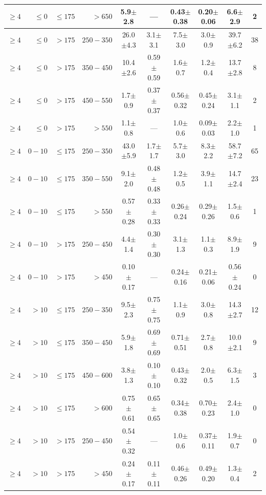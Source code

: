 \begin{table}[htbp]
{\begin{tabular}{|r|r|r|r|c|c|c|c|c|c|}
$\geq4$ & $\leq0$ & $\leq175$ &    $>650$ & 5.9$\pm$2.8 & --- & 0.43$\pm$0.38 & 0.20$\pm$0.06 & 6.6$\pm$2.9 & 2 \\
\hline
$\geq4$ & $\leq0$ &     $>175$ & $250-350$ & 26.0$\pm$4.3 & 3.1$\pm$3.1 & 7.5$\pm$3.0 & 3.0$\pm$0.9 & 39.7$\pm$6.2 & 38 \\
$\geq4$ & $\leq0$ &     $>175$ & $350-450$ & 10.4$\pm$2.6 & 0.59$\pm$0.59 & 1.6$\pm$0.7 & 1.2$\pm$0.4 & 13.7$\pm$2.8 & 8 \\
$\geq4$ & $\leq0$ &     $>175$ & $450-550$ & 1.7$\pm$0.9 & 0.37$\pm$0.37 & 0.56$\pm$0.32 & 0.45$\pm$0.24 & 3.1$\pm$1.1 & 2 \\
$\geq4$ & $\leq0$ &     $>175$ &    $>550$ & 1.1$\pm$0.8 & --- & 1.0$\pm$0.6 & 0.09$\pm$0.03 & 2.2$\pm$1.0 & 1 \\
\hline
$\geq4$ &   $0-10$ & $\leq175$ & $250-350$ & 43.0$\pm$5.9 & 1.7$\pm$1.7 & 5.7$\pm$3.0 & 8.3$\pm$2.2 & 58.7$\pm$7.2 & 65 \\
$\geq4$ &   $0-10$ & $\leq175$ & $350-550$ & 9.1$\pm$2.0 & 0.48$\pm$0.48 & 1.2$\pm$0.5 & 3.9$\pm$1.1 & 14.7$\pm$2.4 & 23 \\
$\geq4$ &   $0-10$ & $\leq175$ &    $>550$ & 0.57$\pm$0.28 & 0.33$\pm$0.33 & 0.26$\pm$0.24 & 0.29$\pm$0.26 & 1.5$\pm$0.6 & 1 \\
\hline
$\geq4$ &   $0-10$ &     $>175$ & $250-450$ & 4.4$\pm$1.4 & 0.30$\pm$0.30 & 3.1$\pm$1.3 & 1.1$\pm$0.3 & 8.9$\pm$1.9 & 9 \\
$\geq4$ &   $0-10$ &     $>175$ &    $>450$ & 0.10$\pm$0.17 & --- & 0.24$\pm$0.16 & 0.21$\pm$0.06 & 0.56$\pm$0.24 & 0 \\
\hline
$\geq4$ &    $>10$ & $\leq175$ & $250-350$ & 9.5$\pm$2.3 & 0.75$\pm$0.75 & 1.1$\pm$0.9 & 3.0$\pm$0.8 & 14.3$\pm$2.7 & 12 \\
$\geq4$ &    $>10$ & $\leq175$ & $350-450$ & 5.9$\pm$1.8 & 0.69$\pm$0.69 & 0.71$\pm$0.51 & 2.7$\pm$0.8 & 10.0$\pm$2.1 & 9 \\
$\geq4$ &    $>10$ & $\leq175$ & $450-600$ & 3.8$\pm$1.3 & 0.10$\pm$0.10 & 0.43$\pm$0.32 & 2.0$\pm$0.5 & 6.3$\pm$1.5 & 3 \\
$\geq4$ &    $>10$ & $\leq175$ &    $>600$ & 0.75$\pm$0.61 & 0.65$\pm$0.65 & 0.34$\pm$0.38 & 0.70$\pm$0.23 & 2.4$\pm$1.0 & 0 \\
\hline
$\geq4$ &    $>10$ &     $>175$ & $250-450$ & 0.54$\pm$0.32 & --- & 1.0$\pm$0.6 & 0.37$\pm$0.11 & 1.9$\pm$0.7 & 0 \\
$\geq4$ &    $>10$ &     $>175$ &    $>450$ & 0.24$\pm$0.17 & 0.11$\pm$0.11 & 0.46$\pm$0.26 & 0.49$\pm$0.20 & 1.3$\pm$0.4 & 2 \\

\end{tabular}}
\end{table}
